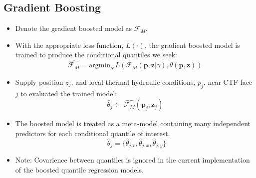 \documentclass[t, pdftex]{beamer}
\begin{document}
\subsection*{Gradient Boosting}
\begin{frame}
\vspace{-16pt}
\begin{itemize}
    \item Denote the gradient boosted model as $\mathcal F_M$.
    \item With the appropriate loss function, $L(\cdot)$, the gradient boosted model is trained to produce the conditional quantiles we seek:
    \[
     \hat{\mathcal F_M} =  \mathrm{argmin}_{\mathcal F}
     L(\mathcal{F}_M (\mathbf p, \mathbf z| \gamma), \theta(\mathbf p, \mathbf z)) 
    \]
    \item Supply position $z_j$, and local thermal hydraulic conditions, $p_j$, near CTF face $j$ to evaluated the trained model:
    \[
    \hat \theta_j \leftarrow \hat{\mathcal F_M}(\mathbf p_j, \mathbf z_j)
    \]
    \item  The boosted model is treated as a meta-model containing many independent predictors for each conditional quantile of interest.
    \[
    \ \ \hat \theta_j = \{\hat \theta_{j,c}, \hat \theta_{j,x}, \hat \theta_{j,y} \}
    \]
    \item Note: Covarience between quantiles is ignored in the current implementation of the boosted quantile regression models.
\end{itemize}
\end{frame}

\end{document}
